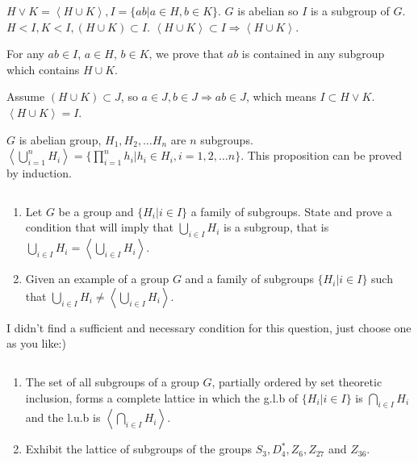 \begin{answer}
    $H\vee K=\left\langle H\cup K\right\rangle, I=\{ab| a\in H,b\in K\}$. $G$ is abelian so $I$ is a subgroup of $G$. $H<I, K<I, (H\cup K)\subset I$. $\left\langle H\cup K\right\rangle\subset I\Rightarrow \left\langle H\cup K\right\rangle$.

    For any $ab\in I$, $a\in H$, $b\in K$, we prove that $ab$ is contained in any subgroup which contains $H\cup K$.

    Assume $(H\cup K)\subset J$, so $a\in J, b\in J\Rightarrow ab\in J$, which means $I\subset H\vee K$. $\left\langle H\cup K\right\rangle = I$.

    $G$ is abelian group, $H_1, H_2,\dots H_n$ are $n$ subgroups. $\left\langle\bigcup\limits_{i=1}^{n}H_i\right\rangle=\{\prod\limits_{i=1}^{n}h_{i}|h_{i}\in H_{i},i=1,2,\dots n\}$. This proposition can be proved by induction.
\end{answer}

$$ $$

\begin{ex}
    \begin{enumerate}
        \item Let $G$ be a group and $\{H_i| i\in I\}$ a family of subgroups. State and prove a condition that will imply that $\bigcup\limits_{i\in I}H_i$ is a subgroup, that is $\bigcup\limits_{i\in I}H_i = \left\langle\bigcup\limits_{i\in I}H_i\right\rangle$.
        \item Given an example of a group $G$ and a family of subgroups $\{H_i|i \in I\}$ such that $\bigcup\limits_{i\in I}H_i \neq \left\langle\bigcup\limits_{i\in I}H_i\right\rangle$.
    \end{enumerate}
\end{ex}

\begin{answer}
    I didn't find a sufficient and necessary condition for this question, just choose one as you like:)
\end{answer}

$$ $$

\begin{ex}
    \begin{enumerate}
        \item The set of all subgroups of a group $G$, partially ordered by set theoretic inclusion, forms a complete lattice in which the g.l.b of $\{H_i|i\in I\}$ is $\bigcap\limits_{i\in I}H_i$ and the l.u.b is $\left\langle\bigcap\limits_{i\in I}H_i\right\rangle$.
        \item Exhibit the lattice of subgroups of the groups $S_3, D_4^*, Z_6, Z_{27}$ and $Z_{36}$.
    \end{enumerate}
\end{ex}


